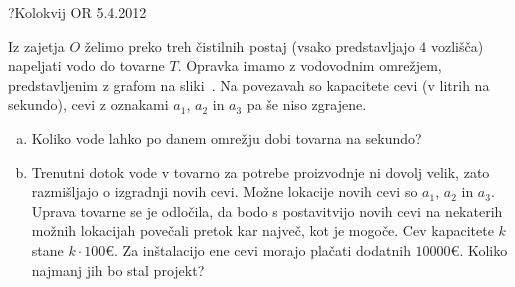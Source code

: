 \begin{naloga}{?}{Kolokvij OR 5.4.2012}
\begin{vprasanje}
Iz zajetja $O$ želimo preko treh čistilnih postaj
(vsako predstavljajo $4$ vozlišča)
napeljati vodo do tovarne $T$.
Opravka imamo z vodovodnim omrežjem,
pred\-stav\-lje\-nim z grafom na sliki~\fig{}.
Na povezavah so kapacitete cevi (v litrih na sekundo),
cevi z oznakami $a_1$, $a_2$ in $a_3$ pa še niso zgrajene.

\begin{enumerate}[(a)]
\item Koliko vode lahko po danem omrežju dobi tovarna na sekundo?

\item Trenutni dotok vode v tovarno za potrebe proizvodnje ni dovolj velik,
zato razmišljajo o izgradnji novih cevi.
Možne lokacije novih cevi so $a_1$, $a_2$ in $a_3$.
Uprava tovarne se je odločila,
da bodo s postavitvijo novih cevi na nekaterih možnih lokacijah
povečali pretok kar največ, kot je mogoče.
Cev kapacitete $k$ stane $k \cdot 100 €$.
Za inštalacijo ene cevi morajo plačati dodatnih $10000 €$.
Koliko najmanj jih bo stal projekt?
\end{enumerate}

\begin{slika}
\makebox[\textwidth][c]{
\pgfslika
}
\end{slika}
\end{vprasanje}
\begin{odgovor}
\end{odgovor}
\end{naloga}
